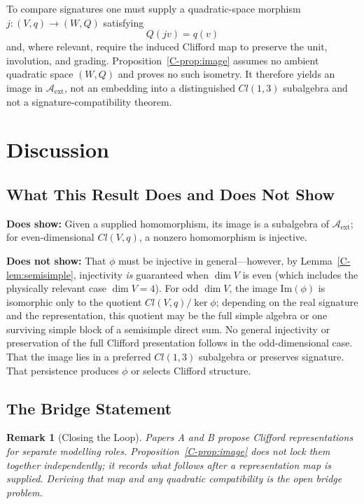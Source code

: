 \documentclass[12pt,a4paper,openany]{book}
\newtheorem{remark}[theorem]{Remark}
\begin{document}
To compare signatures one must supply a quadratic-space morphism $j:(V,q)\to(W,Q)$ satisfying
\begin{equation}
Q(jv)=q(v)
\end{equation}
and, where relevant, require the induced Clifford map to preserve the unit, involution, and grading.  Proposition~\ref{C-prop:image} assumes no ambient quadratic space $(W,Q)$ and proves no such isometry.  It therefore yields an image in $\mathcal A_{\mathrm{ext}}$, not an embedding into a distinguished $Cl(1,3)$ subalgebra and not a signature-compatibility theorem.

\section{Discussion}
\label{C-sec:discussion}

\subsection{What This Result Does and Does Not Show}

\textbf{Does show:}
Given a supplied homomorphism, its image is a subalgebra of $\mathcal A_{\mathrm{ext}}$; for even-dimensional $Cl(V,q)$, a nonzero homomorphism is injective.

\textbf{Does not show:}
That $\phi$ must be injective in general---however,
by Lemma~\ref{C-lem:semisimple}, injectivity \emph{is}
guaranteed when $\dim V$ is even
(which includes the physically relevant case $\dim V = 4$).
For odd $\dim V$, the image $\mathrm{Im}(\phi)$ is
isomorphic only to the quotient $Cl(V,q)/\ker\phi$; depending on the
real signature and the representation, this quotient may be the full
simple algebra or one surviving simple block of a semisimple direct sum.
No general injectivity or preservation of the full Clifford presentation
follows in the odd-dimensional case.
That the image lies in a preferred $Cl(1,3)$ subalgebra or preserves signature.
That persistence produces $\phi$ or selects Clifford structure.

\subsection{The Bridge Statement}

\begin{remark}[Closing the Loop]
Papers A and B propose Clifford representations for separate modelling roles.  Proposition~\ref{C-prop:image} does not lock them together independently; it records what follows after a representation map is supplied.  Deriving that map and any quadratic compatibility is the open bridge problem.
\end{remark}
\end{document}
